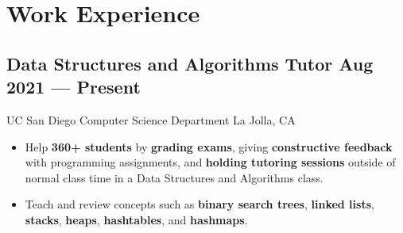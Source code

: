 \documentclass[a4,10pt]{article}
\newcommand{\subtext}[1]{
#1\par\vspace{-0.2cm}}
\newenvironment{zitemize}{
\begin{itemize}\itemsep0pt \parskip0pt \parsep1pt}
{\end{itemize}\vspace{-0.5cm}}
\begin{document}
\section{Work Experience}

        

\subsection*{Data Structures and Algorithms Tutor \hfill Aug 2021 --- Present} 
\subtext{UC San Diego Computer Science Department \hfill La Jolla, CA} 
\vspace{-.1cm}
    \begin{zitemize}
        \item Help \textbf{360+ students} by \textbf{grading exams}, giving \textbf{constructive feedback} with programming assignments, and \textbf{holding tutoring sessions} outside of normal class time in a Data Structures and Algorithms class.
        \item Teach and review concepts such as \textbf{binary search trees}, \textbf{linked lists}, \textbf{stacks}, \textbf{heaps}, \textbf{hashtables}, and \textbf{hashmaps}.
    \end{zitemize}
\end{document}
